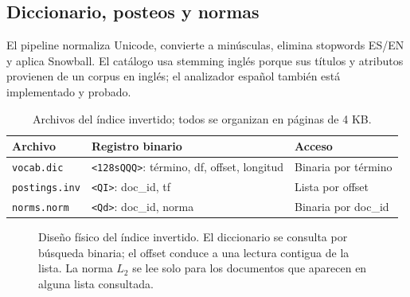 \documentclass[11pt,a4paper]{article}
\newcommand{\code}[1]{\texttt{#1}}
\begin{document}
\subsection{Diccionario, posteos y normas}
El pipeline normaliza Unicode, convierte a minúsculas, elimina stopwords ES/EN y aplica Snowball. El catálogo usa stemming inglés porque sus títulos y atributos provienen de un corpus en inglés; el analizador español también está implementado y probado.

\begin{table}[H]\centering\small
\begin{tabular}{@{}lll@{}}\toprule
Archivo & Registro binario & Acceso\\\midrule
\code{vocab.dic} & \code{<128sQQQ>}: término, df, offset, longitud & Binaria por término\\
\code{postings.inv} & \code{<QI>}: doc\_id, tf & Lista por offset\\
\code{norms.norm} & \code{<Qd>}: doc\_id, norma & Binaria por doc\_id\\\bottomrule
\end{tabular}\caption{Archivos del índice invertido; todos se organizan en páginas de 4 KB.}
\end{table}


\begin{figure}[H]\centering
{}
\caption{Diseño físico del índice invertido. El diccionario se consulta por búsqueda binaria; el offset conduce a una lectura contigua de la lista. La norma $L_2$ se lee solo para los documentos que aparecen en alguna lista consultada.}\label{fig:inv}
\end{figure}
\end{document}
